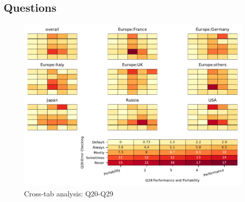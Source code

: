
\subsection{Questions}


\begin{figure}
\begin{center}
\includegraphics[width=12cm]{../pdfs/Q20-Q29.pdf}
\caption{Cross-tab analysis: Q20-Q29}
\label{fig:Q20-Q29}
\end{center}
\end{figure}
